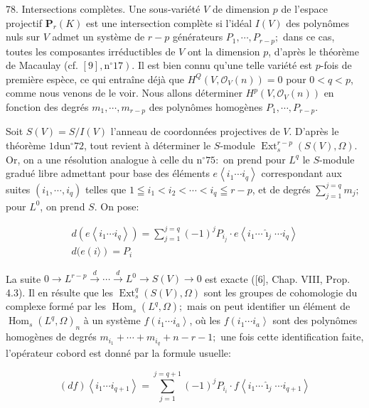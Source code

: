 78. Intersections complètes. Une sous-variété $V$ de dimension $p$ de l'espace projectif $\mathbf{P}_{r}(K)$ est une intersection complète si l'idéal $I(V)$ des polynômes nuls sur $V$ admet un système de $r-p$ générateurs $P_{1}, \cdots, P_{r-p} ;$ dans ce cas, toutes les composantes irréductibles de $V$ ont la dimension $p$, d'après le théorème de Macaulay (cf. $\left.[9], \mathrm{n}^{\circ} 17\right) .$ Il est bien connu qu'une telle variété est $p$-fois de première espèce, ce qui entraîne déjà que $H^{Q}\left(V, \mathcal{O}_{V}(n)\right)=0$ pour $0<q<p$, comme nous venons de le voir. Nous allons déterminer $H^{p}\left(V, \mathcal{O}_{V}(n)\right)$ en fonction des degrés $m_{1}, \cdots, m_{r-p}$ des polynômes homogènes $P_{1}, \cdots, P_{r-p}$.

Soit $S(V)=S / I(V)$ l'anneau de coordonnées projectives de $V .$ D'après le théorème $1 \mathrm{du} \mathrm{n}^{\circ} 72$, tout revient à déterminer le $S$-module $\operatorname{Ext}_{s}^{r-p}(S(V), \Omega)$. Or, on a une résolution analogue à celle du $\mathrm{n}^{\circ} 75:$ on prend pour $L^{q}$ le $S$-module gradué libre admettant pour base des éléments $e\left\langle i_{1} \cdots i_{q}\right\rangle$ correspondant aux suites $\left(i_{1}, \cdots, i_{q}\right)$ telles que $1 \leqq i_{1}<i_{2}<\cdots<i_{q} \leqq r-p$, et de degrés $\sum_{j=1}^{j=q} m_{j} ;$ pour $L^{0}$, on prend $S .$ On pose:

$$
\begin{gathered}
    d\left(e\left\langle i_{1} \cdots i_{q}\right\rangle\right)=\sum_{j=1}^{j=q}(-1)^{j} P_{i_{j}} \cdot e\left\langle i_{1} \cdots \hat{\imath}_{j} \cdots i_{q}\right\rangle \\
    d(e(i\rangle)=P_{i}
\end{gathered}
$$

La suite $0 \rightarrow L^{r-p} \stackrel{d}{\rightarrow} \cdots \stackrel{d}{\rightarrow} L^{0} \rightarrow S(V) \rightarrow 0$ est exacte ([6], Chap. VIII, Prop. 4.3). Il en résulte que les $\operatorname{Ext}_{s}^{q}(S(V), \Omega)$ sont les groupes de cohomologie du complexe formé par les $\operatorname{Hom}_{s}\left(L^{q}, \Omega\right) ;$ mais on peut identifier un élément de $\operatorname{Hom}_{s}\left(L^{q}, \Omega\right)_{n}$ à un système $f\left(i_{1} \cdots i_{a}\right\rangle$, où les $f\left(i_{1} \cdots i_{a}\right\rangle$ sont des polynômes homogènes de degrés $m_{i_{1}}+\cdots+m_{i_{q}}+n-r-1 ;$ une fois cette identification faite, l'opérateur cobord est donné par la formule usuelle:

$$
(d f)\left\langle i_{1} \cdots i_{q+1}\right\rangle=\sum_{j=1}^{j=q+1}(-1)^{j} P_{i_{i}} \cdot f\left\langle i_{1} \cdots \hat{\imath}_{j} \cdots i_{q+1}\right\rangle
$$

